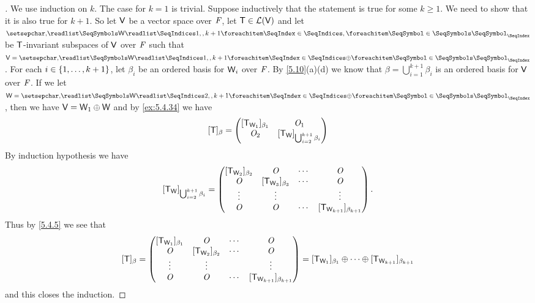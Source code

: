 \begin{proof}[]
	We use induction on \(k\).
	The case for \(k = 1\) is trivial.
	Suppose inductively that the statement is true for some \(k \geq 1\).
	We need to show that it is also true for \(k + 1\).
	So let \(\mathsf{V}\) be a vector space over \(\mathit{F}\), let \(\mathsf{T} \in \mathcal{L}(\mathsf{V})\) and let \(\seq{\W}{1,,k+1}\) be \(\mathsf{T}\)-invariant subspaces of \(\mathsf{V}\) over \(\mathit{F}\) such that \(\V = \seq[\oplus]{\W}{1,,k+1}\).
	For each \(i \in \left\lbrace1, \dots, k + 1\right\rbrace\), let \(\beta_i\) be an ordered basis for \(\mathsf{W}_i\) over \(\mathit{F}\).
	By \cref{5.10}(a)(d) we know that \(\beta = \bigcup_{i = 1}^{k + 1} \beta_i\) is an ordered basis for \(\mathsf{V}\) over \(\mathit{F}\).
	If we let \(\W = \seq[\oplus]{\W}{2,,k+1}\), then we have \(\mathsf{V} = \mathsf{W}_1 \oplus \mathsf{W}\) and by \cref{ex:5.4.34} we have
	\[
		[\mathsf{T}]_{\beta} = \begin{pmatrix}
			[\mathsf{T}_{\mathsf{W}_1}]_{\beta_1} & \mathit{O}_1                                       \\
			\mathit{O}_2                 & [\mathsf{T}_{\mathsf{W}}]_{\bigcup_{i = 2}^{k + 1} \beta_i}
		\end{pmatrix}
	\]
	By induction hypothesis we have
	\[
		[\mathsf{T}_{\mathsf{W}}]_{\bigcup_{i = 2}^{k + 1} \beta_i} = \begin{pmatrix}
			[\mathsf{T}_{\mathsf{W}_2}]_{\beta_2} & \mathit{O}                   & \cdots & \mathit{O}                               \\
			\mathit{O}                   & [\mathsf{T}_{\mathsf{W}_3}]_{\beta_3} & \cdots & \mathit{O}                               \\
			\vdots                & \vdots                &        & \vdots                            \\
			\mathit{O}                   & \mathit{O}                   & \cdots & [\mathsf{T}_{\mathsf{W}_{k + 1}}]_{\beta_{k + 1}}
		\end{pmatrix}.
	\]
	Thus by \cref{5.4.5} we see that
	\[
		[\mathsf{T}]_{\beta} = \begin{pmatrix}
			[\mathsf{T}_{\mathsf{W}_1}]_{\beta_1} & \mathit{O}                   & \cdots & \mathit{O}                               \\
			\mathit{O}                   & [\mathsf{T}_{\mathsf{W}_2}]_{\beta_2} & \cdots & \mathit{O}                               \\
			\vdots                & \vdots                &        & \vdots                            \\
			\mathit{O}                   & \mathit{O}                   & \cdots & [\mathsf{T}_{\mathsf{W}_{k + 1}}]_{\beta_{k + 1}}
		\end{pmatrix} = [\mathsf{T}_{\mathsf{W}_1}]_{\beta_1} \oplus \cdots \oplus [\mathsf{T}_{\mathsf{W}_{k + 1}}]_{\beta_{k + 1}}
	\]
	and this closes the induction.
\end{proof}

